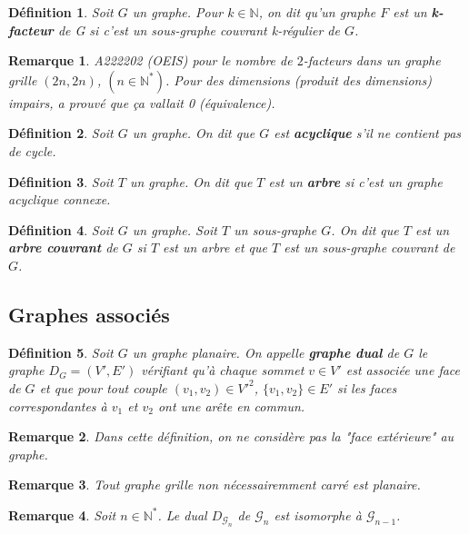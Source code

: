 \documentclass[french,a4paper]{article}
\newtheorem{definition}{Définition}[section]
\newtheorem{remark}{Remarque}[section]
\begin{document}
\begin{definition}
Soit $G$ un graphe.
Pour $k \in \mathbb{N}$, on dit qu'un graphe $F$ est un \textbf{k-facteur} de G si c'est un sous-graphe couvrant k-régulier de $G$.
\end{definition}

\begin{remark}
A222202 (OEIS) pour le nombre de $2$-facteurs dans un graphe grille $(2n,2n)$, $(n \in \mathbb{N}^*)$. Pour des dimensions (produit des dimensions) impairs, \cite{NumFactors1994} a prouvé que ça vallait 0 (équivalence).
\end{remark}

\begin{definition}
Soit $G$ un graphe. On dit que $G$ est \textbf{acyclique} s'il ne contient pas de cycle.
\end{definition}

\begin{definition}
Soit $T$ un graphe. On dit que $T$ est un \textbf{arbre} si c'est un graphe acyclique connexe.
\end{definition}

\begin{definition}
Soit $G$ un graphe. Soit $T$ un sous-graphe $G$.
On dit que $T$ est un \textbf{arbre couvrant} de $G$ si $T$ est un arbre et que $T$ est un sous-graphe couvrant de $G$.
\end{definition}

\subsection{Graphes associés}
\begin{definition}
Soit $G$ un graphe planaire. On appelle \textbf{graphe dual} de $G$ le graphe $D_{G}=(V',E')$ vérifiant qu'à chaque sommet $v \in V'$ est associée une face de $G$ et que pour tout couple $(v_{1},v_{2}) \in V'^{2}$, $\{v_{1},v_{2}\} \in E'$ si les faces correspondantes à $v_{1}$ et $v_{2}$ ont une arête en commun.
\end{definition}

\begin{remark}
Dans cette définition, on ne considère pas la "face extérieure" au graphe.
\end{remark}

\begin{remark}
Tout graphe grille non nécessairemment carré est planaire.
\end{remark}

\begin{remark}
Soit $n \in \mathbb{N}^*$.
Le dual $D_{\mathcal{G}_n}$ de $\mathcal{G}_n$ est isomorphe à $\mathcal{G}_{n-1}$.
\end{remark}
\end{document}
